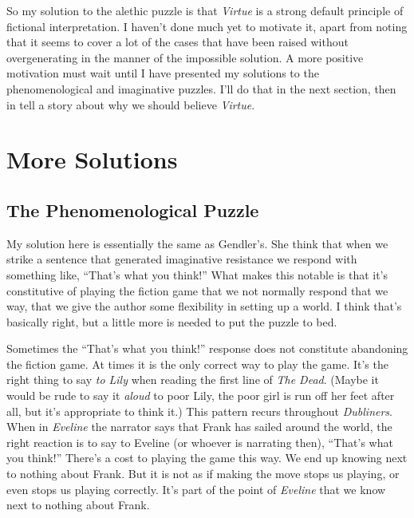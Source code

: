 So my solution to the alethic puzzle is that \textit{Virtue} is a strong default principle of fictional interpretation. I haven't done much yet to motivate it, apart from noting that it seems to cover a lot of the cases that have been raised without overgenerating in the manner of the impossible solution. A more positive motivation must wait until I have presented my solutions to the phenomenological and imaginative puzzles. I'll do that in the next section, then in  tell a story about why we should believe \textit{Virtue}.

\section{More Solutions}

\subsection{The Phenomenological Puzzle}

My solution here is essentially the same as Gendler's. She think that when we strike a sentence that generated imaginative resistance we respond with something like, ``That's what you think!'' What makes this notable is that it's constitutive of playing the fiction game that we not normally respond that we way, that we give the author some flexibility in setting up a world. I think that's basically right, but a little more is needed to put the puzzle to bed. 

Sometimes the ``That's what you think!'' response does not constitute abandoning the fiction game. At times it is the only correct way to play the game. It's the right thing to say \textit{to Lily} when reading the first line of \textit{The Dead}. (Maybe it would be rude to say it \textit{aloud }to poor Lily, the poor girl is run off her feet after all, but it's appropriate to think it.) This pattern recurs throughout \textit{Dubliners}. When in \textit{Eveline} the narrator says that Frank has sailed around the world, the right reaction is to say to Eveline (or whoever is narrating then), ``That's what you think!'' There's a cost to playing the game this way. We end up knowing next to nothing about Frank. But it is not as if making the move stops us playing, or even stops us playing correctly. It's part of the point of \textit{Eveline} that we know next to nothing about Frank. 

